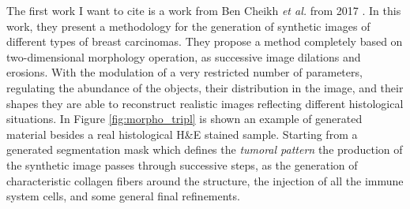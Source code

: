 The first work I want to cite is a work from Ben Cheikh \textit{et al.} from 2017 \cite{10.1117/12.2254452}. In this work, they present a methodology for the generation of synthetic images of different types of breast carcinomas. They propose a method completely based on two-dimensional morphology operation, as successive image dilations and erosions. With the modulation of a very restricted number of parameters, regulating the abundance of the objects, their distribution in the image, and their shapes they are able to reconstruct realistic images reflecting different histological situations. In Figure \ref{fig:morpho_tripl} is shown an example of generated material besides a real histological H\&E stained sample. Starting from a generated segmentation mask which defines the \textit{tumoral pattern} the production of the synthetic image passes through successive steps, as the generation of characteristic collagen fibers around the structure, the injection of all the immune system cells, and some general
final refinements.

